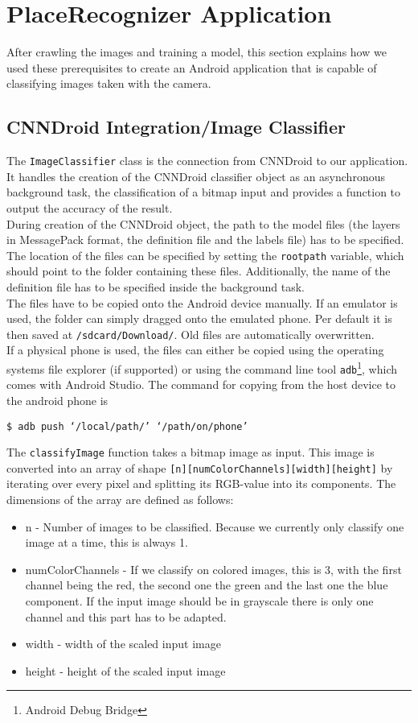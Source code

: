 \section {PlaceRecognizer Application}
After crawling the images and training a model, this section explains how we used these prerequisites to create an Android application that is capable of classifying images taken with the camera.

\subsection {CNNDroid Integration/Image Classifier}
The \lstinline[language=Java]{ImageClassifier} class is the connection from CNNDroid to our application. It handles the creation of the CNNDroid classifier object as an asynchronous background task, the classification of a bitmap input and provides a function to output the accuracy of the result.\\
During creation of the CNNDroid object, the path to the model files (the layers in MessagePack format, the definition file and the labels file) has to be specified. The location of the files can be specified by setting the \texttt{rootpath} variable, which should point to the folder containing these files. Additionally, the name of the definition file has to be specified inside the background task.\\
The files have to be copied onto the Android device manually. If an emulator is used, the folder can simply dragged onto the emulated phone. Per default it is then saved at \texttt{/sdcard/Download/}. Old files are automatically overwritten.\\
If a physical phone is used, the files can either be copied using the operating systems file explorer (if supported) or using the command line tool \texttt{adb}\footnote{Android Debug Bridge}, which comes with Android Studio. The command for copying from the host device to the android phone is
\begin{center}
    \texttt{\$ adb push `/local/path/' `/path/on/phone'}
\end{center}

The \lstinline[language=Java]{classifyImage} function takes a bitmap image as input. This image is converted into an array of shape \texttt{[n][numColorChannels][width][height]} by iterating over every pixel and splitting its RGB-value into its components. The dimensions of the array are defined as follows:
\begin{itemize}
    \item{n - Number of images to be classified. Because we currently only classify one image at a time, this is always 1.}
    \item{numColorChannels - If we classify on colored images, this is 3, with the first channel being the red, the second one the green and the last one the blue component. If the input image should be in grayscale there is only one channel and this part has to be adapted.}
    \item{width - width of the scaled input image}
    \item{height - height of the scaled input image}
\end{itemize}

